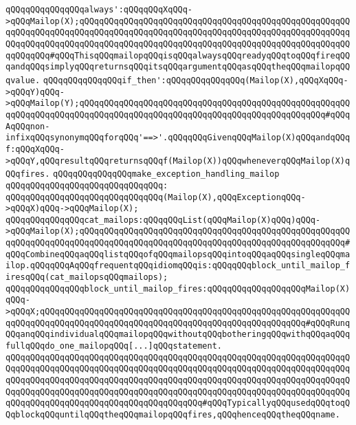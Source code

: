 \newline
\verb|qQQqqQQqqQQqqQQqalways':qQQqqQQqXqQQq->qQQqMailop(X);qQQqqQQqqQQqqQQqqQQqqQQqqQQqqQQqqQQqqQQqqQQqqQQqqQQqqQQqqQQqqQQqqQQqqQQqqQQqqQQqqQQqqQQqqQQqqQQqqQQqqQQqqQQqqQQqqQQqqQQqqQQqqQQqqQQqqQQqqQQqqQQqqQQqqQQqqQQqqQQqqQQqqQQqqQQqqQQqqQQqqQQqqQQqqQQqqQQqqQQqqQQq#qQQqThisqQQqmailopqQQqisqQQqalwaysqQQqreadyqQQqtoqQQqfireqQQqandqQQqsimplyqQQqreturnsqQQqitsqQQqargumentqQQqasqQQqtheqQQqmailopqQQqvalue.|\newline
\newline
\verb|qQQqqQQqqQQqqQQqif_then':qQQqqQQqqQQqqQQq(Mailop(X),qQQqXqQQq->qQQqY)qQQq->qQQqMailop(Y);qQQqqQQqqQQqqQQqqQQqqQQqqQQqqQQqqQQqqQQqqQQqqQQqqQQqqQQqqQQqqQQqqQQqqQQqqQQqqQQqqQQqqQQqqQQqqQQqqQQqqQQqqQQqqQQqqQQqqQQq#qQQqAqQQqnon-infixqQQqsynonymqQQqforqQQq'==>'.qQQqqQQqGivenqQQqMailop(X)qQQqandqQQqf:qQQqXqQQq->qQQqY,qQQqresultqQQqreturnsqQQqf(Mailop(X))qQQqwheneverqQQqMailop(X)qQQqfires.|\newline
\newline
\verb|qQQqqQQqqQQqqQQqmake_exception_handling_mailop|\newline
\verb|qQQqqQQqqQQqqQQqqQQqqQQqqQQqqQQq:|\newline
\verb|qQQqqQQqqQQqqQQqqQQqqQQqqQQqqQQq(Mailop(X),qQQqExceptionqQQq->qQQqX)qQQq->qQQqMailop(X);|\newline
\newline
\verb|qQQqqQQqqQQqqQQqcat_mailops:qQQqqQQqList(qQQqMailop(X)qQQq)qQQq->qQQqMailop(X);qQQqqQQqqQQqqQQqqQQqqQQqqQQqqQQqqQQqqQQqqQQqqQQqqQQqqQQqqQQqqQQqqQQqqQQqqQQqqQQqqQQqqQQqqQQqqQQqqQQqqQQqqQQqqQQqqQQqqQQqqQQq#qQQqCombineqQQqaqQQqlistqQQqofqQQqmailopsqQQqintoqQQqaqQQqsingleqQQqmailop.qQQqqQQqAqQQqfrequentqQQqidiomqQQqis:qQQqqQQqblock_until_mailop_firesqQQq(cat_mailopsqQQqmailops);|\newline
\newline
\verb|qQQqqQQqqQQqqQQqblock_until_mailop_fires:qQQqqQQqqQQqqQQqqQQqMailop(X)qQQq->qQQqX;qQQqqQQqqQQqqQQqqQQqqQQqqQQqqQQqqQQqqQQqqQQqqQQqqQQqqQQqqQQqqQQqqQQqqQQqqQQqqQQqqQQqqQQqqQQqqQQqqQQqqQQqqQQqqQQqqQQqqQQqqQQq#qQQqRunqQQqanqQQqindividualqQQqmailopqQQqwithoutqQQqbotheringqQQqwithqQQqaqQQqfullqQQqdo_one_mailopqQQq[...]qQQqstatement.|\newline
\verb|qQQqqQQqqQQqqQQqqQQqqQQqqQQqqQQqqQQqqQQqqQQqqQQqqQQqqQQqqQQqqQQqqQQqqQQqqQQqqQQqqQQqqQQqqQQqqQQqqQQqqQQqqQQqqQQqqQQqqQQqqQQqqQQqqQQqqQQqqQQqqQQqqQQqqQQqqQQqqQQqqQQqqQQqqQQqqQQqqQQqqQQqqQQqqQQqqQQqqQQqqQQqqQQqqQQqqQQqqQQqqQQqqQQqqQQqqQQqqQQqqQQqqQQqqQQqqQQqqQQqqQQqqQQqqQQqqQQqqQQqqQQqqQQqqQQqqQQqqQQqqQQqqQQqqQQqqQQqqQQq#qQQqTypicallyqQQqusedqQQqtoqQQqblockqQQquntilqQQqtheqQQqmailopqQQqfires,qQQqhenceqQQqtheqQQqname.|\newline
